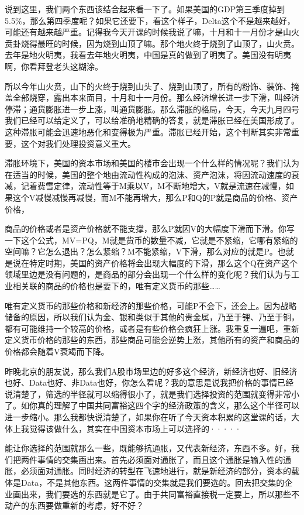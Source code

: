 \documentclass[UTF8, 12pt, a4paper]{ctexrep}
\begin{document}
说到这里，我们两个东西该结合起来看一下了。如果美国的GDP第三季度掉到5.5\%，那么第四季度呢？如果它还要下，看这个样子，Delta这个不是越来越好，可能还有越来越严重。记得我今天开课的时候我说了嘛，十月和十一月份才是山火贲卦烧得最旺的时候，因为烧到山顶了嘛。那个地火终于烧到了山顶了，山火贲。去年是地火明夷，我看去年地火明夷，中国是真的做到了明夷了。美国没有明夷啊，你看拜登老头这糊涂。

所以今年山火贲，山下的火终于烧到山头了、烧到山顶了，所有的粉饰、装饰、掩盖全部烧穿，露出本来面目，十月和十一月份。那么经济增长进一步下滑，叫经济停滞；通货膨胀进一步上涨，叫通货膨胀。那么滞胀的格局，今天，今天九月四号我们已经可以给定义了，可以给准确地精确的答复，就是滞胀已经在美国形成了。这种滞胀可能会迅速地恶化和变得极为严重。滞胀已经开始，这个判断其实非常重要，这个对我们处理投资意义重大。

滞胀环境下，美国的资本市场和美国的楼市会出现一个什么样的情况呢？我们认为在适当的时候，美国的整个地由流动性构成的泡沫、资产泡沫，将因流动速度的衰减，记着费雪定律，流动性等于M乘以V，M不断地增大，V就是流速在减慢，如果这个V减慢减慢再减慢，而M不能再增大，那么P和Q的P就是商品的价格、资产价格，

商品的价格或者是资产价格就不能支撑，那么P就因V的大幅度下滑而下滑。你写一下这个公式，MV=PQ，M就是货币的数量不减，它就是不紧缩，它哪有紧缩的空间嘛？它怎么退出？怎么紧缩？M不能紧缩，V下滑，那么对应的就是P。也就是说在特定时期，美国的资产价格将会出现大幅度的下滑，那么这个Q在资产这个领域里边是没有问题的，是商品的部分会出现一个什么样的变化呢？我们认为与工业相关联的商品的价格也是要下的，唯有定义货币的那些……

唯有定义货币的那些价格和新经济的那些价格，可能P不会下，还会上。因为战略储备的原因，所以我们认为金、银和类似于其他的贵金属，乃至于锂、乃至于铜，都有可能维持一个较高的价格，或者是有些价格会疯狂上涨。我重复一遍吧，重新定义货币价格的那些的东西，那些商品可能会逆势上涨，其他所有的资产和商品的价格都会随着V衰竭而下降。

昨晚北京的朋友说，那么我们A股市场里边的好多这个经济，新经济也好、旧经济也好、Data也好、非Data也好，你怎么看呢？我的意思是说我把价格的事情已经说清楚了，筛选的半径就可以缩得很小了，就是我们选择投资的范围就变得非常小了。如你真的理解了中国共同富裕这四个字的经济政策的含义，那么这个半径可以进一步缩小。那么我都快说清楚了，如果你在听了今天资本积累的这堂课的话，大体上我觉得该做什么，其实在中国资本市场上可以选择的·····

能让你选择的范围就那么一些，既能够抗通胀，又代表新经济，东西不多。好，我们把两件事情的交集画出来。首先必须面对通胀了，而且这个通胀是输入性的通胀，必须面对通胀。同时经济的转型在飞速地进行，就是新经济的部分，资本的载体是Data，不是其他东西。这两件事情的交集就是我们要选的。回去把交集的企业画出来，我们要选的东西就是它了。由于共同富裕直接税一定要上，所以那些不动产的东西要做重新的考虑，好不好？
\end{document}
